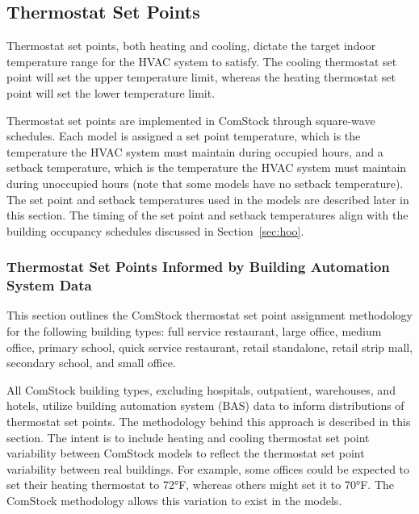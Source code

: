 \subsection{Thermostat Set Points} \label{section:therm_setpoints}
Thermostat set points, both heating and cooling, dictate the target indoor temperature range for the HVAC system to satisfy. The cooling thermostat set point will set the upper temperature limit, whereas the heating thermostat set point will set the lower temperature limit.

Thermostat set points are implemented in ComStock through square-wave schedules. Each model is assigned a set point temperature, which is the temperature the HVAC system must maintain during occupied hours, and a setback temperature, which is the temperature the HVAC system must maintain during unoccupied hours (note that some models have no setback temperature). The set point and setback temperatures used in the models are described later in this section. The timing of the set point and setback temperatures align with the building occupancy schedules discussed in Section~\ref{sec:hoo}.

\subsubsection{Thermostat Set Points Informed by Building Automation System Data}
\label{section:therm_setpoints_bas}

This section outlines the ComStock thermostat set point assignment methodology for the following building types: full service restaurant, large office, medium office, primary school, quick service restaurant, retail standalone, retail strip mall, secondary school, and small office.

All ComStock building types, excluding hospitals, outpatient, warehouses, and hotels, utilize building automation system (BAS) data to inform distributions of thermostat set points. The methodology behind this approach is described in this section. The intent is to include heating and cooling thermostat set point variability between ComStock models to reflect the thermostat set point variability between real buildings. For example, some offices could be expected to set their heating thermostat to 72°F, whereas others might set it to 70°F. The ComStock methodology allows this variation to exist in the models.

